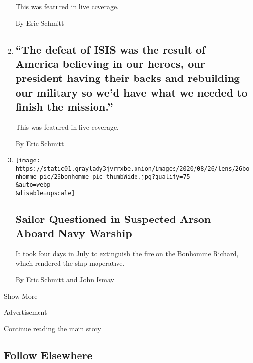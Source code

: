 \begin{enumerate}
  This was featured in live coverage.

  By Eric Schmitt
\item
  \href{/live/2020/08/26/us/rnc-fact-check/the-defeat-of-isis-was-the-result-of-america-believing-in-our-heroes-our-president-having-their-backs-and-rebuilding-our-militar}{}

  \hypertarget{the-defeat-of-isis-was-the-result-of-america-believing-in-our-heroes-our-president-having-their-backs-and-rebuilding-our-military-so-wed-have-what-we-needed-to-finish-the-mission}{%
  \subsection{``The defeat of ISIS was the result of America believing
  in our heroes, our president having their backs and rebuilding our
  military so we'd have what we needed to finish the
  mission.''}\label{the-defeat-of-isis-was-the-result-of-america-believing-in-our-heroes-our-president-having-their-backs-and-rebuilding-our-military-so-wed-have-what-we-needed-to-finish-the-mission}}

  This was featured in live coverage.

  By Eric Schmitt
\item
  \href{/2020/08/27/us/navy-bonhomme-richard-arson-fire.html}{}

  \texttt{[image: https://static01.graylady3jvrrxbe.onion/images/2020/08/26/lens/26bonhomme-pic/26bonhomme-pic-thumbWide.jpg?quality=75\\\&auto=webp\\\&disable=upscale]}

  \hypertarget{sailor-questioned-in-suspected-arson-aboard-navy-warship}{%
  \subsection{Sailor Questioned in Suspected Arson Aboard Navy
  Warship}\label{sailor-questioned-in-suspected-arson-aboard-navy-warship}}

  It took four days in July to extinguish the fire on the Bonhomme
  Richard, which rendered the ship inoperative.

  By Eric Schmitt and John Ismay
\end{enumerate}

Show More

Advertisement

\protect\hyperlink{after-mid2}{Continue reading the main story}

\hypertarget{follow-elsewhere}{%
\subsection{Follow Elsewhere}\label{follow-elsewhere}}


